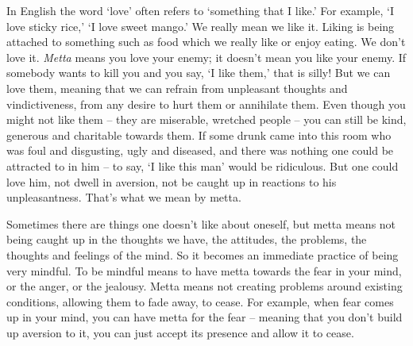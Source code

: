 
In English the word `love' often refers to `something that I like.' For example, `I love sticky rice,' `I love sweet mango.' We really mean we like it. Liking is being attached to something such as food which we really like or enjoy eating. We don't love it. \textit{Metta} means you love your enemy; it doesn't mean you like your enemy. If somebody wants to kill you and you say, `I like them,' that is silly! But we can love them, meaning that we can refrain from unpleasant thoughts and vindictiveness, from any desire to hurt them or annihilate them. Even though you might not like them -- they are miserable, wretched people -- you can still be kind, generous and charitable towards them. If some drunk came into this room who was foul and disgusting, ugly and diseased, and there was nothing one could be attracted to in him -- to say, `I like this man' would be ridiculous. But one could love him, not dwell in aversion, not be caught up in reactions to his unpleasantness. That's what we mean by metta.

Sometimes there are things one doesn't like about oneself, but metta means not being caught up in the thoughts we have, the attitudes, the problems, the thoughts and feelings of the mind. So it becomes an immediate practice of being very mindful. To be mindful means to have metta towards the fear in your mind, or the anger, or the jealousy. Metta means not creating problems around existing conditions, allowing them to fade away, to cease. For example, when fear comes up in your mind, you can have metta for the fear -- meaning that you don't build up aversion to it, you can just accept its presence and allow it to cease.

